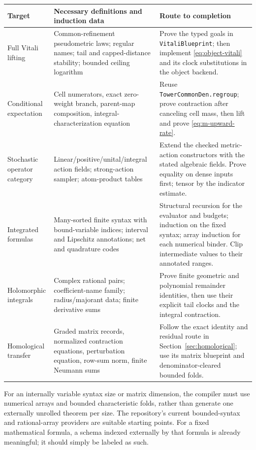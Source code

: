 \begin{longtable}{@{}p{}p{}p{}@{}}
\toprule
Target & Necessary definitions and induction data & Route to completion\\
\midrule
\endhead
Full Vitali lifting & Common-refinement pseudometric laws; regular names; tail and capped-distance stability; bounded ceiling logarithm & Prove the typed goals in \texttt{VitaliBlueprint}; then implement \eqref{eq:object-vitali} and its clock substitutions in the object backend.\\
Conditional expectation & Cell numerators, exact zero-weight branch, parent-map composition, integral-characterization equation & Reuse \texttt{TowerCommonDen.regroup}; prove contraction after canceling cell mass, then lift and prove \eqref{eq:m-upward-rate}.\\
Stochastic operator category & Linear/positive/unital/integral action fields; strong-action sampler; atom-product tables & Extend the checked metric-action constructors with the stated algebraic fields. Prove equality on dense inputs first; tensor by the indicator estimate.\\
Integrated formulas & Many-sorted finite syntax with bound-variable indices; interval and Lipschitz annotations; net and quadrature codes & Structural recursion for the evaluator and budgets; induction on the fixed syntax; array induction for each numerical binder. Clip intermediate values to their annotated ranges.\\
Holomorphic integrals & Complex rational pairs; coefficient-name family; radius/majorant data; finite derivative sums & Prove finite geometric and polynomial remainder identities, then use their explicit tail clocks and the integral contraction.\\
Homological transfer & Graded matrix records, normalized contraction equations, perturbation equation, row-sum norm, finite Neumann sums & Follow the exact identity and residual route in Section~\ref{sec:homological}; use its matrix blueprint and denominator-cleared bounded folds.\\
\bottomrule
\end{longtable}

For an internally variable syntax size or matrix dimension, the compiler
must use numerical arrays and bounded characteristic folds, rather than
generate one externally unrolled theorem per size. The repository's current
bounded-syntax and rational-array providers are suitable starting points.
For a fixed mathematical formula, a schema indexed externally by that
formula is already meaningful; it should simply be labeled as such.

